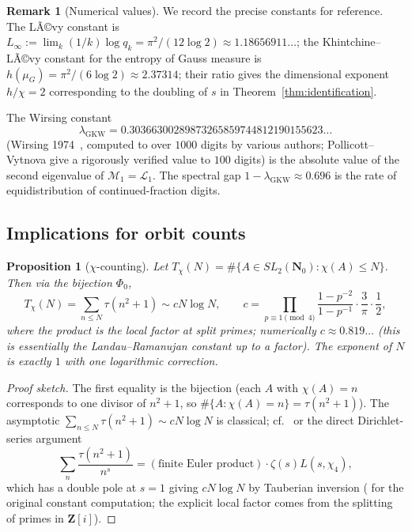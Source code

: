 ﻿\documentclass[11pt]{article}
\newtheorem{proposition}[theorem]{Proposition}
\theoremstyle{definition}
\newtheorem{remark}[theorem]{Remark}
\newcommand{\Nz}{\mathbf{N}_0}
\newcommand{\Z}{\mathbf{Z}}
\newcommand{\SLNz}{SL_2(\Nz)}
\newcommand{\Phio}{\Phi_0}
\newcommand{\Lop}{\mathcal{L}}
\newcommand{\chiA}{\chi}
\newcommand{\GKW}{\mathrm{GKW}}
\begin{document}
\begin{remark}[Numerical values]
We record the precise constants for reference. The LÃ©vy constant is $L_\infty:=\lim_k(1/k)\log q_k=\pi^2/(12\log 2)\approx 1.18656911\dots$; the Khintchine--LÃ©vy constant for the entropy of Gauss measure is $h(\mu_G)=\pi^2/(6\log 2)\approx 2.37314$; their ratio gives the dimensional exponent $h/\chi=2$ corresponding to the doubling of $s$ in Theorem~\ref{thm:identification}.

The Wirsing constant
\[
\lambda_\GKW = 0.30366300289873265859744812190155623\ldots
\]
(Wirsing 1974~\cite{wirsing}, computed to over $1000$ digits by various authors; Pollicott--Vytnova \cite{pollicott-vytnova} give a rigorously verified value to $100$ digits) is the absolute value of the second eigenvalue of $\mathcal{M}_1=\Lop_1$. The spectral gap $1-\lambda_\GKW\approx 0.696$ is the rate of equidistribution of continued-fraction digits.
\end{remark}

\subsection{Implications for orbit counts}\label{sec:counting}

\begin{proposition}[$\chi$-counting]\label{prop:chi-count}
Let $T_\chi(N)=\#\{A\in\SLNz:\chiA(A)\le N\}$. Then via the bijection $\Phio$,
\[
T_\chi(N) = \sum_{n\le N}\tau(n^2+1) \sim cN\log N,\qquad c=\prod_{p\equiv 1\pmod 4}\frac{1-p^{-2}}{1-p^{-1}}\cdot\frac{3}{\pi}\cdot\frac{1}{2},
\]
where the product is the local factor at split primes; numerically $c\approx 0.819\ldots$ (this is essentially the Landau--Ramanujan constant up to a factor). The exponent of $N$ is exactly $1$ with one logarithmic correction.
\end{proposition}

\begin{proof}[Proof sketch]
The first equality is the bijection (each $A$ with $\chi(A)=n$ corresponds to one divisor of $n^2+1$, so $\#\{A:\chiA(A)=n\}=\tau(n^2+1)$). The asymptotic $\sum_{n\le N}\tau(n^2+1)\sim cN\log N$ is classical; cf.\ \cite[Theorem~14.7]{iwaniec-kowalski} or the direct Dirichlet-series argument
\[
\sum_n\frac{\tau(n^2+1)}{n^s} = (\text{finite Euler product})\cdot\zeta(s)L(s,\chi_4),
\]
which has a double pole at $s=1$ giving $cN\log N$ by Tauberian inversion (\cite{landau-ramanujan} for the original constant computation; the explicit local factor comes from the splitting of primes in $\Z[i]$).
\end{proof}
\end{document}

